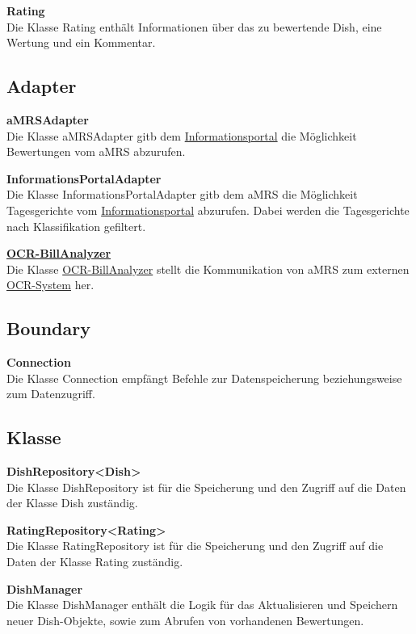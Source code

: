 \noindent \textbf{Rating} \\
Die Klasse Rating enthält Informationen über das zu bewertende Dish, eine Wertung und ein Kommentar.

\subsection*{Adapter}
\noindent \textbf{aMRSAdapter}\\
Die Klasse aMRSAdapter gitb dem \hyperref[gls:informationsportal]{Informationsportal} die Möglichkeit Bewertungen vom \ac{aMRS} abzurufen.
\newline

\noindent \textbf{InformationsPortalAdapter}\\
Die Klasse InformationsPortalAdapter gitb dem \ac{aMRS} die Möglichkeit Tagesgerichte vom \hyperref[gls:informationsportal]{Informationsportal} abzurufen.
Dabei werden die Tagesgerichte nach Klassifikation gefiltert.
\newline

\noindent \hyperref[gls:ocr-System]{\textbf{OCR-BillAnalyzer}}\\
Die Klasse \hyperref[gls:ocr-System]{OCR-BillAnalyzer} stellt die Kommunikation von \ac{aMRS} zum externen \hyperref[gls:ocr-System]{OCR-System} her.


\subsection*{Boundary}
\noindent \textbf{Connection}\\
Die Klasse Connection empfängt Befehle zur Datenspeicherung beziehungsweise zum Datenzugriff.

\subsection*{Klasse}
\noindent \textbf{DishRepository<Dish>}\\
Die Klasse DishRepository ist für die Speicherung und den Zugriff auf die Daten der Klasse Dish zuständig.
\newline

\noindent \textbf{RatingRepository<Rating>}\\
Die Klasse RatingRepository ist für die Speicherung und den Zugriff auf die Daten der Klasse Rating zuständig.
\newline

\noindent \textbf{DishManager}\\
Die Klasse DishManager enthält die Logik für das Aktualisieren und Speichern neuer Dish-Objekte, sowie zum Abrufen von
vorhandenen Bewertungen.
\newline

